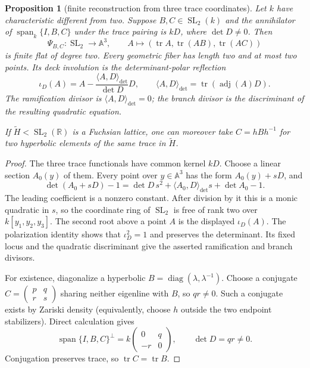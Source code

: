 \documentclass[11pt,reqno]{amsart}
\newtheorem{proposition}[theorem]{Proposition}
\theoremstyle{definition}
\theoremstyle{remark}
\newcommand{\R}{\mathbb R}
\newcommand{\Tr}{\operatorname{tr}}
\newcommand{\Span}{\operatorname{span}}
\newcommand{\SL}{\operatorname{SL}}
\newcommand{\diag}{\operatorname{diag}}
\begin{document}
\begin{proposition}[finite reconstruction from three trace coordinates]
\label{prop:three-trace-reconstruction}
Let \(k\) have characteristic different from two.  Suppose
\(B,C\in\SL_2(k)\) and the annihilator of
\(\Span_k\{I,B,C\}\) under the trace pairing is \(kD\), where
\(\det D\ne0\).  Then
\[
 \Psi_{B,C}:\SL_2\longrightarrow\mathbb A^3,
 \qquad A\longmapsto(\Tr A,\Tr(AB),\Tr(AC))
\]
is finite flat of degree two.  Every geometric fiber has length two and at
most two points.  Its deck involution is the determinant-polar reflection
\[
 \iota_D(A)=A-\frac{\langle A,D\rangle_{\det}}{\det D}D,
 \qquad
 \langle A,D\rangle_{\det}=\Tr(\operatorname{adj}(A)D).
\]
The ramification divisor is
\(\langle A,D\rangle_{\det}=0\); the branch divisor is the discriminant of
the resulting quadratic equation.

If \(\widetilde H<\SL_2(\R)\) is a Fuchsian lattice, one can moreover take
\(C=hBh^{-1}\) for two hyperbolic elements of the same trace in
\(\widetilde H\).
\end{proposition}

\begin{proof}
The three trace functionals have common kernel \(kD\).  Choose a linear
section \(A_0(y)\) of them.  Every point over \(y\in\mathbb A^3\) has the form
\(A_0(y)+sD\), and
\[
 \det(A_0+sD)-1
 =\det D\,s^2+\langle A_0,D\rangle_{\det}s+\det A_0-1.
\]
The leading coefficient is a nonzero constant.  After division by it this is
a monic quadratic in \(s\), so the coordinate ring of \(\SL_2\) is free of
rank two over \(k[y_1,y_2,y_3]\).  The second root above a point \(A\) is
the displayed \(\iota_D(A)\).  The polarization identity shows that
\(\iota_D^2=1\) and preserves the determinant.  Its fixed locus and the
quadratic discriminant give the asserted ramification and branch divisors.

For existence, diagonalize a hyperbolic
\(B=\diag(\lambda,\lambda^{-1})\).  Choose a conjugate
\(C=(\begin{smallmatrix}p&q\\r&s\end{smallmatrix})\) sharing neither
eigenline with \(B\), so \(qr\ne0\).  Such a conjugate exists by
Zariski density (equivalently, choose \(h\) outside the two endpoint
stabilizers).  Direct calculation gives
\[
 \Span\{I,B,C\}^{\perp}
 =k\begin{pmatrix}0&q\\-r&0\end{pmatrix},
 \qquad \det D=qr\ne0.
\]
Conjugation preserves trace, so \(\Tr C=\Tr B\).
\end{proof}
\end{document}
